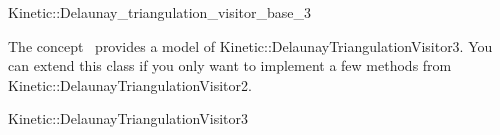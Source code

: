 

\begin{ccRefClass}{Kinetic::Delaunay_triangulation_visitor_base_3}


\ccDefinition
  
The concept \ccRefName\ provides a model of
Kinetic::DelaunayTriangulationVisitor3. You can extend this class if you only
want to implement a few methods from Kinetic::DelaunayTriangulationVisitor2.

\ccIsModel

Kinetic::DelaunayTriangulationVisitor3

\ccCreation
{}  %


\ccSeeAlso



\end{ccRefClass}


